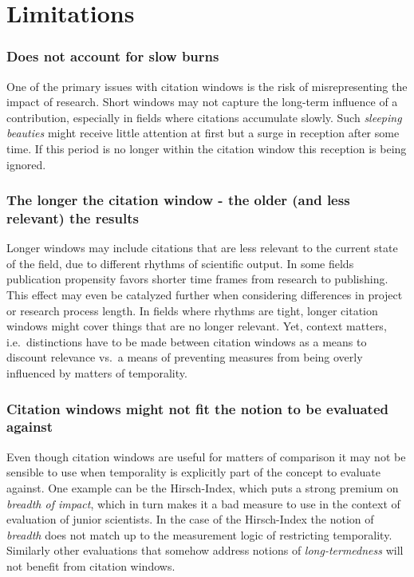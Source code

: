 \documentclass[
  letterpaper,
]{scrreprt}
\begin{document}
\section{Limitations}\label{limitations-1}

\subsubsection{Does not account for slow
burns}\label{does-not-account-for-slow-burns}

One of the primary issues with citation windows is the risk of
misrepresenting the impact of research. Short windows may not capture
the long-term influence of a contribution, especially in fields where
citations accumulate slowly. Such \emph{sleeping beauties} might receive
little attention at first but a surge in reception after some time. If
this period is no longer within the citation window this reception is
being ignored.

\subsubsection{The longer the citation window - the older (and less
relevant) the
results}\label{the-longer-the-citation-window---the-older-and-less-relevant-the-results}

Longer windows may include citations that are less relevant to the
current state of the field, due to different rhythms of scientific
output. In some fields publication propensity favors shorter time frames
from research to publishing. This effect may even be catalyzed further
when considering differences in project or research process length. In
fields where rhythms are tight, longer citation windows might cover
things that are no longer relevant. Yet, context matters,
i.e.~distinctions have to be made between citation windows as a means to
discount relevance vs.~a means of preventing measures from being overly
influenced by matters of temporality.

\subsubsection{Citation windows might not fit the notion to be evaluated
against}\label{citation-windows-might-not-fit-the-notion-to-be-evaluated-against}

Even though citation windows are useful for matters of comparison it may
not be sensible to use when temporality is explicitly part of the
concept to evaluate against. One example can be the Hirsch-Index, which
puts a strong premium on \emph{breadth of impact}, which in turn makes
it a bad measure to use in the context of evaluation of junior
scientists. In the case of the Hirsch-Index the notion of \emph{breadth}
does not match up to the measurement logic of restricting temporality.
Similarly other evaluations that somehow address notions of
\emph{long-termedness} will not benefit from citation windows.
\end{document}
